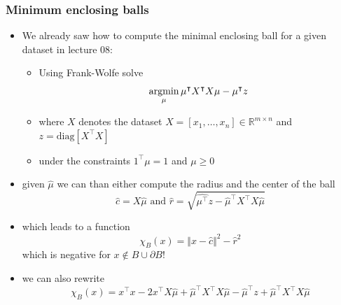 \documentclass[10pt,aspectratio=169,handout]{beamer}
\begin{document}
\begin{frame}
    \frametitle{Minimum enclosing balls}

    \begin{itemize}
        \item We already saw how to compute the minimal enclosing ball for a given dataset in lecture 08:
        \begin{itemize}
            \item Using Frank-Wolfe solve \[\operatorname*{argmin}_{\mu} \mu^\intercal X^\intercal X\mu-\mu^\intercal z\]
            \item where $X$ denotes the dataset $X=[x_1,\dots,x_n]\in\mathbb{R}^{m\times n}$ and $z=\text{diag}[X^\intercal X]$
            \item under the constraints $1^\intercal\mu=1$ and $\mu\geq 0$
        \end{itemize}
        \item given $\hat{\mu}$ we can than either compute the radius and the center of the ball 
        \[\hat{c}=X\hat{\mu}\text{  and  } \hat{r}=\sqrt{\hat{\mu^\intercal}z-\hat{\mu}^\intercal X^\intercal X\hat{\mu}}\]
        \item which leads to a function \[\chi_B(x)=\Vert x-\hat{c}\Vert^2 -\hat{r}^2\] which is negative for $x\notin B\cup\partial B$!
        \item we can also rewrite \[\chi_B(x)=x^\intercal x-2x^\intercal X \hat{\mu}+\hat{\mu}^\intercal X^\intercal X \hat{\mu}-\hat{\mu}^\intercal z+\hat{\mu}^\intercal X^\intercal X\hat{\mu}\]
    \end{itemize}

\end{frame}
\end{document}
